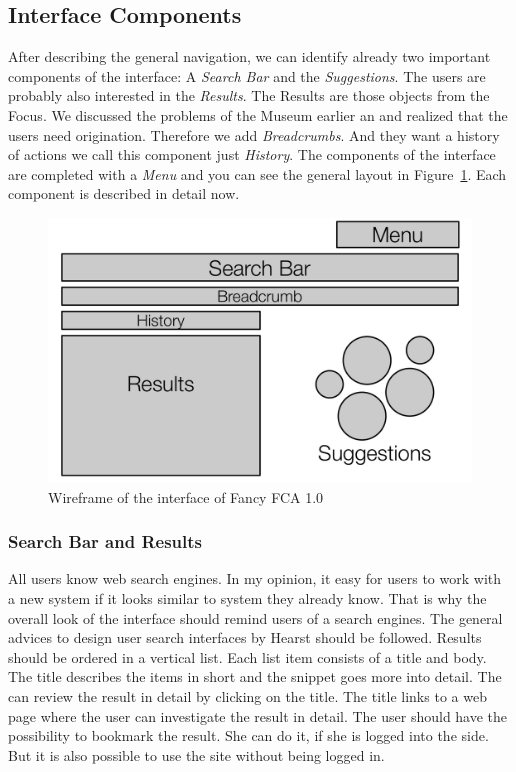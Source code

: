 \documentclass[11pt]{report}
\begin{document}
\subsection{Interface Components}
After describing the general navigation, we can identify already two important components of the interface: A \textit{Search Bar} and the \textit{Suggestions}. The users are probably also interested in the \textit{Results}. The Results are those objects from the Focus. We discussed the problems of the Museum earlier an and realized that the users need origination. Therefore we add \textit{Breadcrumbs}. And they want a history of actions we call this component just \textit{History}. The components of the interface are completed with a \textit{Menu} and you can see the general layout in Figure~\ref{figure:schema}. Each component is described in detail now. \\

\begin{figure}[!ht]
	\centering
	\includegraphics[width=\linewidth]{images/schema}
\caption{Wireframe of the interface of Fancy FCA 1.0}
\label{figure:schema}
\end{figure}

\subsubsection{Search Bar and Results}

All users know web search engines. In my opinion, it easy for users to work with a new system if it looks similar to system they already know. That is why the overall look of the interface should remind users of a search engines. The general advices to design user search interfaces by Hearst \cite{Hearst2009} should be followed. Results should be ordered in a vertical list. Each list item consists of a title and body. The title describes the items in short and the snippet goes more into detail. The can review the result in detail by clicking on the title. The title links to a web page where the user can investigate the result in detail. The user should have the possibility to bookmark the result. She can do it, if she is logged into the side. But it is also possible to use the site without being logged in.
\end{document}
